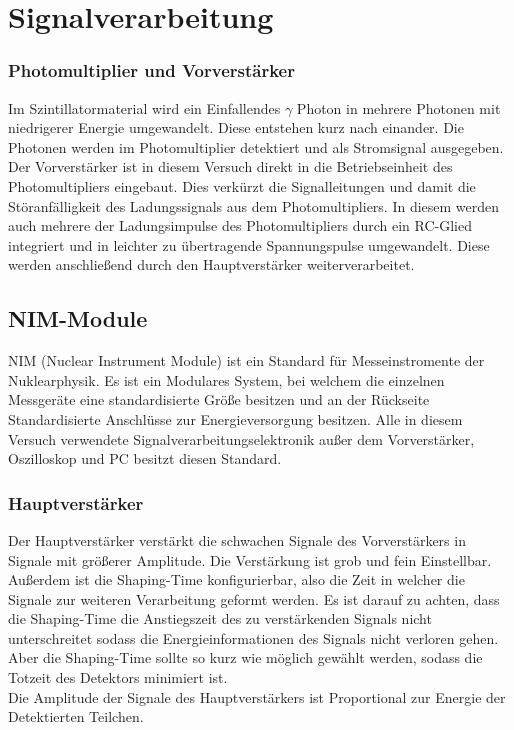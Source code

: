 \section{Signalverarbeitung}

\subsubsection{Photomultiplier und Vorverstärker}
Im Szintillatormaterial wird ein Einfallendes $\gamma$ Photon in mehrere Photonen mit niedrigerer Energie umgewandelt. Diese entstehen kurz nach einander.
Die Photonen werden im Photomultiplier detektiert und als Stromsignal ausgegeben. \\
Der Vorverstärker ist in diesem Versuch direkt in die Betriebseinheit des Photomultipliers eingebaut. Dies verkürzt die Signalleitungen und damit die Störanfälligkeit des Ladungssignals aus dem Photomultipliers. In diesem werden auch mehrere der Ladungsimpulse des Photomultipliers durch ein RC-Glied integriert und in leichter zu übertragende Spannungspulse umgewandelt. Diese werden anschließend durch den Hauptverstärker weiterverarbeitet.

\subsection{NIM-Module}
NIM (Nuclear Instrument Module) ist ein Standard für Messeinstromente der Nuklearphysik. Es ist ein Modulares System, bei welchem die einzelnen Messgeräte eine standardisierte Größe besitzen und an der Rückseite Standardisierte Anschlüsse zur Energieversorgung besitzen. Alle in diesem Versuch verwendete Signalverarbeitungselektronik außer dem Vorverstärker, Oszilloskop und PC besitzt diesen Standard. 
\subsubsection{Hauptverstärker}
Der Hauptverstärker verstärkt die schwachen Signale des Vorverstärkers in Signale mit größerer Amplitude. Die Verstärkung ist grob und fein Einstellbar. Außerdem ist die Shaping-Time konfigurierbar, also die Zeit in welcher die Signale zur weiteren Verarbeitung geformt werden. Es ist darauf zu achten, dass die Shaping-Time die Anstiegszeit des zu verstärkenden Signals nicht unterschreitet sodass die Energieinformationen des Signals nicht verloren gehen. Aber die Shaping-Time sollte so kurz wie möglich gewählt werden, sodass die Totzeit des Detektors minimiert ist. \\
Die Amplitude der Signale des Hauptverstärkers ist Proportional zur Energie der Detektierten Teilchen.
